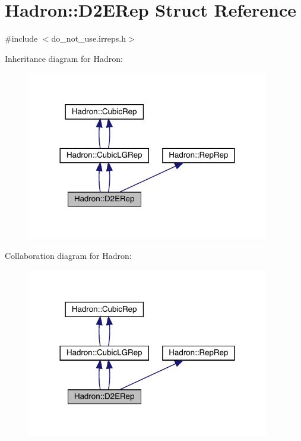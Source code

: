 \hypertarget{structHadron_1_1D2ERep}{}\section{Hadron\+:\+:D2\+E\+Rep Struct Reference}
\label{structHadron_1_1D2ERep}


{\ttfamily \#include $<$do\+\_\+not\+\_\+use.\+irreps.\+h$>$}



Inheritance diagram for Hadron\+:\nopagebreak
\begin{figure}[H]
\begin{center}
\leavevmode
\includegraphics[width=300pt]{dc/dcb/structHadron_1_1D2ERep__inherit__graph}
\end{center}
\end{figure}


Collaboration diagram for Hadron\+:\nopagebreak
\begin{figure}[H]
\begin{center}
\leavevmode
\includegraphics[width=300pt]{d7/d17/structHadron_1_1D2ERep__coll__graph}
\end{center}
\end{figure}
